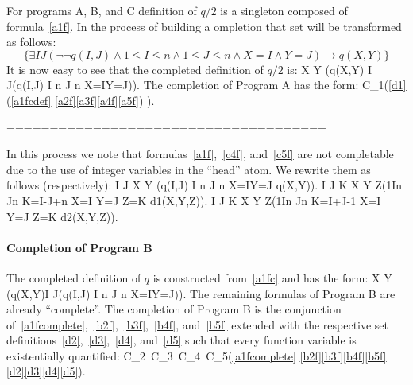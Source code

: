 \documentclass{article}
\begin{document}
For programs A, B, and C definition of $q/2$ is a singleton composed of formula~\eqref{a1f}.
In the process of building a ompletion that set will be transformed as follows:
\[
\big\{\exists I J (\neg\neg q(I,J) \land 1\leq I \leq n \land 1 \leq J \leq n 
\wedge X=I\wedge Y=J) 
\to q(X,Y)
\big\}
\]
It is now easy to see that the completed definition of $q/2$ is:
\beq
\forall X Y \Big(q(X,Y)\lrar 
\exists I J(\neg\neg q(I,J) \leq I \leq n  \leq J \leq n \wedge X=I\wedge Y=J)\Big).
The completion of Program A has the form:
\beq
\forall C_1\Big(\eqref{d1}\rar\big(\eqref{a1fcdef}
\wedge \eqref{a2f}\wedge\eqref{a3f}\wedge\eqref{a4f}\wedge\eqref{a5f}\big)
\Big).

=====================================

In this process we note that formulas~\eqref{a1f},~\eqref{c4f}, and~\eqref{c5f} are not completable due to the use of integer variables in the ``head'' atom. We rewrite them as follows (respectively):
\beq
\forall I J X Y (\neg\neg q(I,J) \leq I \leq n  \leq J \leq n \wedge X=I\wedge Y=J
 \to q(X,Y)).
\beq
\forall I J K X Y Z(1\leq I\leq n \leq J\leq n \land 
K=I-J+n \land X=I \land Y=J \land Z=K \to d1(X,Y,Z)).
\beq
\forall I J K X Y Z(1\leq I\leq n \leq J\leq n \land 
K=I+J-1 \land X=I \land Y=J \land Z=K \to d2(X,Y,Z)).


\paragraph{Completion of Program B}
The completed definition of $q$ is constructed from~\eqref{a1fc} and has the form:
\beq
\forall X Y \Big(q(X,Y)\lrar\exists I J(\neg\neg q(I,J) \leq I \leq n  \leq J \leq n \wedge X=I\wedge Y=J)\Big).
The remaining formulas of Program B are already ``complete''.
The completion of Program B is the conjunction of~\eqref{a1fcomplete},~\eqref{b2f},~\eqref{b3f},~\eqref{b4f}, and~\eqref{b5f} extended with the respective set definitions~\eqref{d2},~\eqref{d3},~\eqref{d4}, and~\eqref{d5} such that every function variable is existentially quantified:
\beq
\exists C_2~C_3~C_4~C_5\Big(\eqref{a1fcomplete}\wedge 
\eqref{b2f}\wedge\eqref{b3f}\wedge\eqref{b4f}\wedge\eqref{b5f}
\wedge\eqref{d2}\wedge\eqref{d3}\wedge\eqref{d4}\wedge\eqref{d5}\Big).
\end{document}
